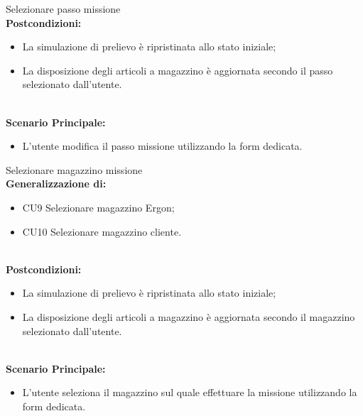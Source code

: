 \begin{usecase}{7}{Selezionare passo missione}
\textbf{\\Postcondizioni:}
\begin{itemize}
    \item La simulazione di prelievo è ripristinata allo stato iniziale;
    \item La disposizione degli articoli a magazzino è aggiornata secondo il passo selezionato dall'utente.
\end{itemize}
\textbf{\\Scenario Principale:}
\begin{itemize}
    \item L'utente modifica il passo missione utilizzando la form dedicata.
\end{itemize}
\label{uc:scenario-principale}
\end{usecase}
\begin{usecase}{8}{Selezionare magazzino missione}
    \textbf{\\Generalizzazione di:}
\begin{itemize}
    \item CU9 Selezionare magazzino Ergon;
    \item CU10 Selezionare magazzino cliente.
\end{itemize}
\textbf{\\Postcondizioni:}
\begin{itemize}
    \item La simulazione di prelievo è ripristinata allo stato iniziale;
    \item La disposizione degli articoli a magazzino è aggiornata secondo il magazzino selezionato dall'utente.
\end{itemize}
\textbf{\\Scenario Principale:}
\begin{itemize}
    \item L'utente seleziona il magazzino sul quale effettuare la missione utilizzando la form dedicata.
\end{itemize}
\label{uc:scenario-principale}
\end{usecase}
